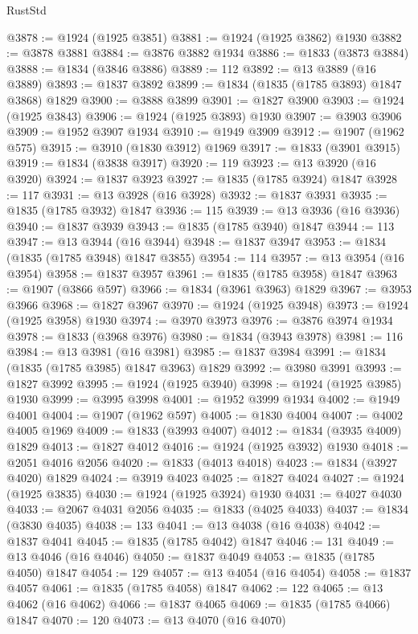 \begin{lexlean}{RustStd}
\begin{coremodule}
@3878 := @1924 (@1925 @3851)
@3881 := @1924 (@1925 @3862) @1930
@3882 := @3878 @3881
@3884 := @3876 @3882 @1934
@3886 := @1833 (@3873 @3884)
@3888 := @1834 (@3846 @3886)
@3889 := 112
@3892 := @13 @3889 (@16 @3889)
@3893 := @1837 @3892
@3899 := @1834 (@1835 (@1785 @3893) @1847 @3868) @1829
@3900 := @3888 @3899
@3901 := @1827 @3900
@3903 := @1924 (@1925 @3843)
@3906 := @1924 (@1925 @3893) @1930
@3907 := @3903 @3906
@3909 := @1952 @3907 @1934
@3910 := @1949 @3909
@3912 := @1907 (@1962 @575)
@3915 := @3910 (@1830 @3912) @1969
@3917 := @1833 (@3901 @3915)
@3919 := @1834 (@3838 @3917)
@3920 := 119
@3923 := @13 @3920 (@16 @3920)
@3924 := @1837 @3923
@3927 := @1835 (@1785 @3924) @1847
@3928 := 117
@3931 := @13 @3928 (@16 @3928)
@3932 := @1837 @3931
@3935 := @1835 (@1785 @3932) @1847
@3936 := 115
@3939 := @13 @3936 (@16 @3936)
@3940 := @1837 @3939
@3943 := @1835 (@1785 @3940) @1847
@3944 := 113
@3947 := @13 @3944 (@16 @3944)
@3948 := @1837 @3947
@3953 := @1834 (@1835 (@1785 @3948) @1847 @3855)
@3954 := 114
@3957 := @13 @3954 (@16 @3954)
@3958 := @1837 @3957
@3961 := @1835 (@1785 @3958) @1847
@3963 := @1907 (@3866 @597)
@3966 := @1834 (@3961 @3963) @1829
@3967 := @3953 @3966
@3968 := @1827 @3967
@3970 := @1924 (@1925 @3948)
@3973 := @1924 (@1925 @3958) @1930
@3974 := @3970 @3973
@3976 := @3876 @3974 @1934
@3978 := @1833 (@3968 @3976)
@3980 := @1834 (@3943 @3978)
@3981 := 116
@3984 := @13 @3981 (@16 @3981)
@3985 := @1837 @3984
@3991 := @1834 (@1835 (@1785 @3985) @1847 @3963) @1829
@3992 := @3980 @3991
@3993 := @1827 @3992
@3995 := @1924 (@1925 @3940)
@3998 := @1924 (@1925 @3985) @1930
@3999 := @3995 @3998
@4001 := @1952 @3999 @1934
@4002 := @1949 @4001
@4004 := @1907 (@1962 @597)
@4005 := @1830 @4004
@4007 := @4002 @4005 @1969
@4009 := @1833 (@3993 @4007)
@4012 := @1834 (@3935 @4009) @1829
@4013 := @1827 @4012
@4016 := @1924 (@1925 @3932) @1930
@4018 := @2051 @4016 @2056
@4020 := @1833 (@4013 @4018)
@4023 := @1834 (@3927 @4020) @1829
@4024 := @3919 @4023
@4025 := @1827 @4024
@4027 := @1924 (@1925 @3835)
@4030 := @1924 (@1925 @3924) @1930
@4031 := @4027 @4030
@4033 := @2067 @4031 @2056
@4035 := @1833 (@4025 @4033)
@4037 := @1834 (@3830 @4035)
@4038 := 133
@4041 := @13 @4038 (@16 @4038)
@4042 := @1837 @4041
@4045 := @1835 (@1785 @4042) @1847
@4046 := 131
@4049 := @13 @4046 (@16 @4046)
@4050 := @1837 @4049
@4053 := @1835 (@1785 @4050) @1847
@4054 := 129
@4057 := @13 @4054 (@16 @4054)
@4058 := @1837 @4057
@4061 := @1835 (@1785 @4058) @1847
@4062 := 122
@4065 := @13 @4062 (@16 @4062)
@4066 := @1837 @4065
@4069 := @1835 (@1785 @4066) @1847
@4070 := 120
@4073 := @13 @4070 (@16 @4070)

\end{coremodule}
\end{lexlean}
